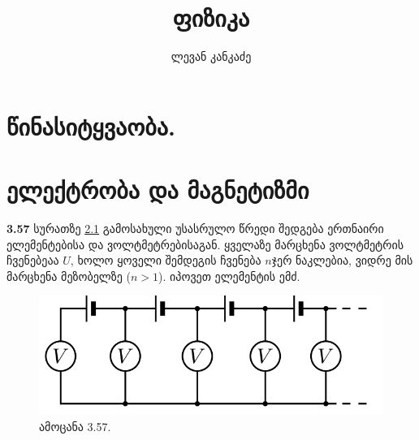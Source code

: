 \documentclass[a4paper]{book}
\title{ფიზიკა}
\author{ლევან კანკაძე}
\begin{document}
\maketitle

\tableofcontents

\chapter{წინასიტყვაობა.}
\chapter{ელექტრობა და მაგნეტიზმი}
\textbf{3.57} სურათზე \ref{fig:3_57} გამოსახული უსასრულო წრედი შედგება ერთნაირი ელემენტებისა და ვოლტმეტრებისაგან. ყველაზე მარცხენა ვოლტმეტრის ჩვენებეაა $U$, ხოლო ყოველი შემდეგის ჩვენება $n$ჯერ ნაკლებია, ვიდრე მის მარცხენა მეზობელზე ($n>1$). იპოვეთ ელემენტის ემძ.


	\begin{figure}[H]
		\centering
		\includegraphics[width=0.2\columnwidth]{images/3_57}
		\caption{ამოცანა 3.57.}
		\label{fig:3_57}
	\end{figure}
\end{document}
